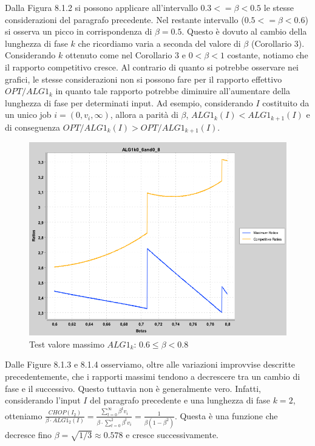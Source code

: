 \documentclass[12pt]{article}
\begin{document}
Dalla Figura 8.1.2 si possono applicare all'intervallo $0.3 <= \beta < 0.5$ le stesse considerazioni del paragrafo precedente. Nel restante intervallo ($0.5 <= \beta < 0.6$) si osserva un picco in corrispondenza di $\beta = 0.5$. Questo è dovuto al cambio della lunghezza di fase $k$ che ricordiamo varia a seconda del valore di $\beta$ (Corollario 3). Considerando $k$ ottenuto come nel Corollario 3 e $0 <\beta < 1$ costante, notiamo che il rapporto competitivo cresce. Al contrario di quanto si potrebbe osservare nei grafici, le stesse considerazioni non si possono fare per il rapporto effettivo $OPT/ALG1_{k}$ in quanto tale rapporto potrebbe diminuire all'aumentare della lunghezza di fase per determinati input. Ad esempio, considerando $I$ costituito da un unico job $i = (0, v_{i},\infty)$, allora a parità di $\beta$, $ALG1_{k}(I) < ALG1_{k+1}(I)$ e di conseguenza $OPT/ALG1_{k}(I) > OPT/ALG1_{k+1}(I)$.
\begin{figure}[H]
\caption{Test valore massimo $ALG1_{k}$: $0.6 \leq \beta < 0.8$}
\centering
\includegraphics[scale=0.4]{max/ALG1k0_6and0_8.png}
\end{figure}
Dalle Figure 8.1.3 e 8.1.4 osserviamo, oltre alle variazioni improvvise descritte precedentemente, che i rapporti massimi tendono a decrescere tra un cambio di fase e il successivo. Questo tuttavia non è generalmente vero. Infatti, considerando l'input $I$ del paragrafo precedente e una lunghezza di fase $k = 2$, otteniamo $\frac{CHOP(I_{2})}{\beta \cdot ALG1_{2}(I)} = \frac{\sum_{t = 0}^{\infty}\beta^{t}v_{i}}{\beta \cdot \sum_{t = 0}^{2}\beta^{t} v_{i}} = \frac{1}{\beta(1 - \beta^{2})}$. Questa è una funzione che decresce fino $\beta = \sqrt{1/3} \approx 0.578$ e cresce successivamente.
\end{document}
